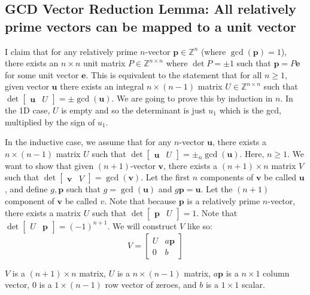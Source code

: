 \documentclass{article}
\def\u{\textbf{u}}
\def\v{\textbf{v}}
\def\p{\textbf{p}}
\def\e{\textbf{e}}
\def\Z{\mathbb{Z}}
\begin{document}
\subsection{GCD Vector Reduction Lemma: All relatively prime vectors can be mapped to a unit vector}
I claim that for any relatively prime $n$-vector $\p\in\Z^n$ (where $\gcd(\p)=1$), there exists an $n\times n$ unit matrix $P\in \Z^{n\times n}$ where $\det P = \pm1$ such that $\p=P\e$ for some unit vector $\e$. This is equivalent to the statement that for all $n\geq 1$, given vector $\u$ there exists an integral $n\times (n-1)$ matrix $U\in\Z^{n\times n}$ such that $\det\begin{bmatrix}\u & U\end{bmatrix}=\pm\gcd(\u)$. We are going to prove this by induction in $n$. In the 1D case, $U$ is empty and so the determinant is just $u_1$ which is the gcd, multiplied by the sign of $u_1$.

In the inductive case, we assume that for any $n$-vector $\u$, there exists a $n\times(n-1)$ matrix $U$ such that $\det\begin{bmatrix}\u & U\end{bmatrix}=\pm_n\gcd(\u)$. Here, $n\geq 1$. We want to show that given $(n+1)$-vector $\v$, there exists a $(n+1)\times n$ matrix $V$ such that $\det\begin{bmatrix}\v & V\end{bmatrix}=\gcd(\v)$. Let the first $n$ components of $\v$ be called $\u$, and define $g,\p$ such that $g=\gcd(\u)$ and $g\p=\u$. Let the $(n+1)$ component of $\v$ be called $v$. Note that because $\p$ is a relatively prime $n$-vector, there exists a matrix $U$ such that $\det\begin{bmatrix}\p & U\end{bmatrix}=1$. Note that $\det\begin{bmatrix}U & \p\end{bmatrix} = (-1)^{n+1}$. We will construct $V$ like so:
\begin{equation*}
    V = \begin{bmatrix}
        U & a\p\\
        0 & b
    \end{bmatrix}
\end{equation*}

$V$ is a $(n+1)\times n$ matrix, $U$ is a $n\times(n-1)$ matrix, $a\p$ is a $n\times 1$ column vector, $0$ is a $1\times (n-1)$ row vector of zeroes, and $b$ is a $1\times 1$ scalar.
\end{document}
